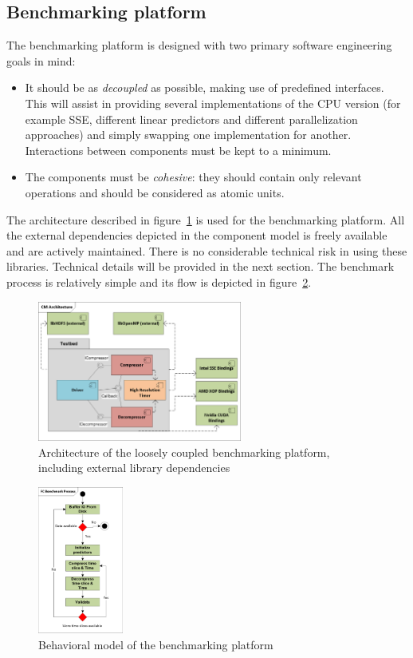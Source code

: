 \subsection{Benchmarking platform}
The benchmarking platform is designed with two primary software engineering goals in mind:
\begin{itemize}
 \item It should be as \textit{decoupled} as possible, making use of predefined interfaces. This will assist in providing several implementations of the CPU version (for example SSE, different linear predictors and different parallelization
 approaches) and simply swapping one implementation for another. Interactions between components must be kept to a minimum.
 \item The components must be \textit{cohesive}: they should contain only relevant operations and should be considered as atomic units.
\end{itemize}
The architecture described in figure~\ref{TOOL_ARCH} is used for the benchmarking platform. All the external dependencies depicted in the component model is freely available
and are actively maintained. There is no considerable technical risk in using these libraries. Technical details will be provided in the next section. The 
benchmark process is relatively simple and its flow is depicted in figure~\ref{TOOL_FLOW}.
\begin{figure}[h!]
\begin{mdframed}
 \centering
 \includegraphics[width=0.6\textwidth]{Thesis_Arc.png}
 \caption{Architecture of the loosely coupled benchmarking platform, including external library dependencies}
 \label{TOOL_ARCH}
\end{mdframed}
\end{figure}
\begin{figure}[h!]
\begin{mdframed}
 \centering
 \includegraphics[width=0.25\textwidth]{Thesis_Flow.png}
 \caption{Behavioral model of the benchmarking platform}
 \label{TOOL_FLOW}
\end{mdframed}
\end{figure}

